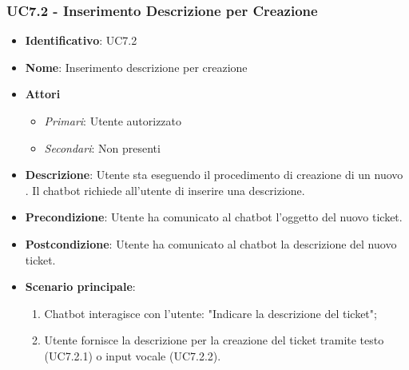 \subsubsection{UC7.2 - Inserimento Descrizione per Creazione }
\begin{itemize}
	\item \textbf{Identificativo}: UC7.2
	\item \textbf{Nome}: Inserimento descrizione per creazione  
	\item \textbf{Attori}
	\begin{itemize} 
		\item \textit{Primari}: Utente autorizzato
		\item \textit{Secondari}: Non presenti
	\end{itemize}
	\item \textbf{Descrizione}:  Utente sta eseguendo il procedimento di creazione di un nuovo . Il chatbot richiede all'utente di inserire una descrizione. 
	\item \textbf{Precondizione}: Utente ha comunicato al chatbot l'oggetto del nuovo ticket.
	\item \textbf{Postcondizione}: Utente ha comunicato al chatbot la descrizione del nuovo ticket.
	\item \textbf{Scenario principale}: \begin{enumerate}
		\item Chatbot interagisce con l'utente: "Indicare la descrizione del ticket";
		\item Utente fornisce la descrizione per la creazione del ticket tramite testo (UC7.2.1) o input vocale (UC7.2.2).
	\end{enumerate}
	\end{itemize}


